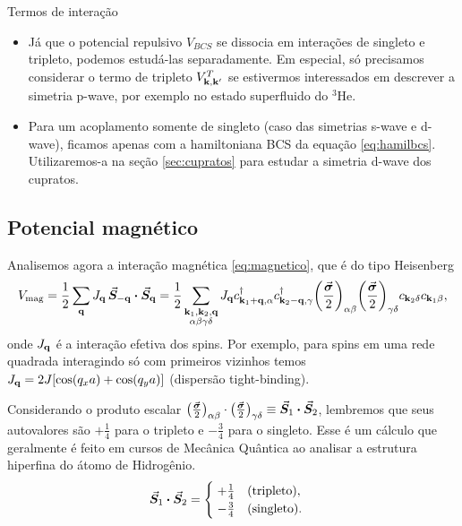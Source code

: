 \documentclass[a4paper,10pt]{article}
\begin{document}
\begin{section}{Termos de interação}
\begin{itemize}
\item Já que o potencial repulsivo $V_{BCS}$ se dissocia em interações de singleto e tripleto, podemos estudá-las separadamente. Em especial, só precisamos considerar o termo de tripleto $V^T_{\vb{k},\vb{k}'}$ se estivermos interessados em descrever a simetria p-wave, por exemplo no estado superfluido do $^3$He.

\n

\item Para um acoplamento somente de singleto (caso das simetrias s-wave e d-wave), ficamos apenas com a hamiltoniana BCS da equação \ref{eq:hamilbcs}. Utilizaremos-a na seção \ref{sec:cupratos} para estudar a simetria d-wave dos cupratos.
\end{itemize}

\subsection{Potencial magnético}

Analisemos agora a interação magnética \ref{eq:magnetico}, que é do tipo Heisenberg
$$
V_{\text{mag}} = \frac{1}{2} \sum_{\q} J_{\q} \, \va*{S}_{-\q} \vdot \va*{S}_{\q} =
\frac{1}{2} \sum_{\substack{\k_1,\k_2,\q \\ \alpha\beta\gamma\delta}} J_{\q} c_{\k_1+\q,\alpha}^\d c_{\k_2-\q,\gamma}^\d
\qty(\frac{\va*{\s}}{2})_{\alpha\beta} \qty(\frac{\va*{\s}}{2})_{\gamma\delta} c_{\k_2\delta} c_{\k_1\beta},
$$
onde $J_{\vb{q}}$ é a interação efetiva dos spins. Por exemplo, para spins em uma rede quadrada interagindo só com primeiros vizinhos temos $J_{\vb{q}} = 2 J [\cos(q_x a) + \cos(q_y a)]$ (dispersão tight-binding).

\n

Considerando o produto escalar $\qty(\frac{\va*{\s}}{2})_{\alpha\beta} \cdot \qty(\frac{\va*{\s}}{2})_{\gamma\delta} \equiv \va*{S}_1 \vdot \va*{S}_2$, lembremos que seus autovalores são $+\frac{1}{4}$ para o tripleto e $-\frac{3}{4}$ para o singleto. Esse é um cálculo que geralmente é feito em cursos de Mecânica Quântica ao analisar a estrutura hiperfina do átomo de Hidrogênio.
\begin{equation} \label{eq:spineig}
\va*{S}_1 \vdot \va*{S}_2 =
\begin{cases}
\; +\frac{1}{4} \quad \text{(tripleto)}, \\
\; -\frac{3}{4} \quad \text{(singleto)}.
\end{cases}
\end{equation}




\end{section}
\end{document}

